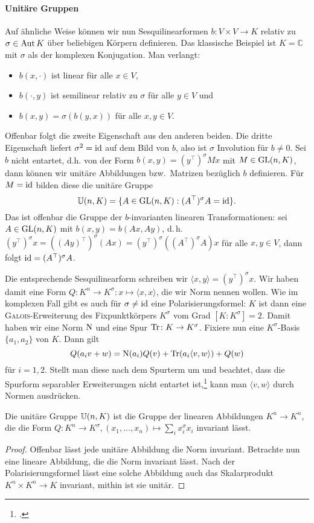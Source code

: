 \paragraph{Unitäre Gruppen} Auf ähnliche Weise können wir nun Sesquilinearformen $b: V \times V \to K$ relativ zu $\sigma \in \operatorname{Aut} K$ über beliebigen Körpern definieren. Das klassische Beispiel ist $K = \mathbb C$ mit $\sigma$ als der komplexen Konjugation. Man verlangt:
\begin{itemize}
\item $b(x, \cdot)$ ist linear für alle $x \in V$,
\item $b(\cdot, y)$ ist semilinear relativ zu $\sigma$ für alle $y \in V$ und
\item $b(x,y) = \sigma(b(y,x))$ für alle $x,y \in V$.
\end{itemize}
Offenbar folgt die zweite Eigenschaft aus den anderen beiden. Die dritte Eigenschaft liefert $\sigma^2 = \operatorname{id}$ auf dem Bild von $b$, also ist $\sigma$ Involution für $b \neq 0$. Sei $b$ nicht entartet, d.h. von der Form $b(x,y) = (y^\top)^\sigma M x$ mit $M \in \mathrm{GL}(n,K)$, dann können wir unitäre Abbildungen bzw.~Matrizen bezüglich $b$ definieren. Für $M = \operatorname{id}$ bilden diese die unitäre Gruppe
\begin{equation}
\mathbb U(n,K) = \{ A \in \mathrm{GL}(n,K): (A^\top)^\sigma A = \operatorname{id} \}.
\end{equation}
Das ist offenbar die Gruppe der $b$-invarianten linearen Transformationen: sei $A \in \mathrm{GL}(n,K)$ mit $b(x,y) = b(Ax,Ay)$, d.\,h. $(y^\top)^\sigma x = ((Ay)^\top)^\sigma (Ax) = (y^\top)^\sigma ((A^\top)^\sigma A) x$ für alle $x, y \in V$, dann folgt $\operatorname{id} = (A^\top)^\sigma A$.

Die entsprechende Sesquilinearform schreiben wir $\langle x, y \rangle = (y^\top)^\sigma x$. Wir haben damit eine Form $Q: K^n \to K^\sigma: x \mapsto \langle x, x \rangle$, die wir Norm nennen wollen. Wie im komplexen Fall gibt es auch für $\sigma \neq \operatorname{id}$ eine Polarisierungsformel: $K$ ist dann eine \textsc{Galois}-Erweiterung des Fixpunktkörpers $K^\sigma$ vom Grad $[K:K^\sigma] = 2$. Damit haben wir eine Norm $\operatorname{N}$ und eine Spur $\operatorname{Tr} \colon K \rightarrow K^\sigma$. Fixiere nun eine $K^\sigma$-Basis $\{a_1, a_2\}$ von $K$. Dann gilt
\begin{equation*}
Q(a_i v + w) = \operatorname{N}(a_i) Q(v) + \operatorname{Tr}(a_i \langle v, w \rangle) + Q(w)
\end{equation*}
für $i = 1,2$. Stellt man diese nach dem Spurterm um und beachtet, dass die Spurform separabler Erweiterungen nicht entartet ist,\footcite[S.~199, Satz~7]{Bosch} kann man $\langle v, w \rangle$ durch Normen ausdrücken.
\begin{fact} \label{fact:norminv}
Die unitäre Gruppe $\mathbb U(n,K)$ ist die Gruppe der linearen Abbildungen $K^n \to K^n$, die die Form $Q: K^n \to K^\sigma, (x_1, \dots, x_n) \mapsto \sum_i x_i^\sigma x_i$ invariant lässt.
\end{fact}
\begin{proof}
Offenbar lässt jede unitäre Abbildung die Norm invariant. Betrachte nun eine lineare Abbildung, die die Norm invariant lässt. Nach der Polarisierungsformel lässt eine solche Abbildung auch das Skalarprodukt $K^n \times K^n \to K$ invariant, mithin ist sie unitär.
\end{proof}

